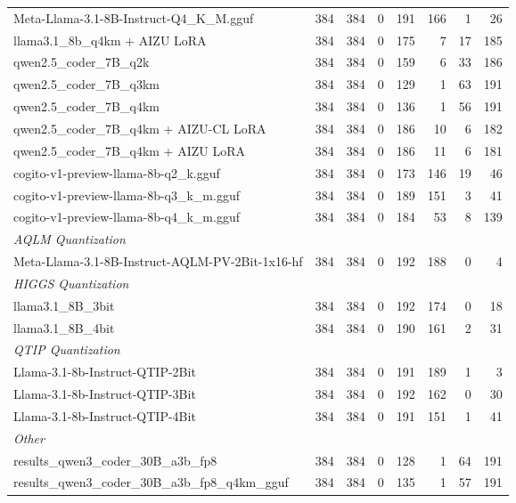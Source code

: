 \begin{table}[htbp]
{\begin{tabular}{lrrrrrrr}
    Meta-Llama-3.1-8B-Instruct-Q4\_K\_M.gguf & 384 & 384 & 0 & 191 & 166 & 1 & 26 \\
    llama3.1\_8b\_q4km + AIZU LoRA & 384 & 384 & 0 & 175 & 7 & 17 & 185 \\
    qwen2.5\_coder\_7B\_q2k & 384 & 384 & 0 & 159 & 6 & 33 & 186 \\
    qwen2.5\_coder\_7B\_q3km & 384 & 384 & 0 & 129 & 1 & 63 & 191 \\
    qwen2.5\_coder\_7B\_q4km & 384 & 384 & 0 & 136 & 1 & 56 & 191 \\
    qwen2.5\_coder\_7B\_q4km + AIZU-CL LoRA & 384 & 384 & 0 & 186 & 10 & 6 & 182 \\
    qwen2.5\_coder\_7B\_q4km + AIZU LoRA & 384 & 384 & 0 & 186 & 11 & 6 & 181 \\
    cogito-v1-preview-llama-8b-q2\_k.gguf & 384 & 384 & 0 & 173 & 146 & 19 & 46 \\
    cogito-v1-preview-llama-8b-q3\_k\_m.gguf & 384 & 384 & 0 & 189 & 151 & 3 & 41 \\
    cogito-v1-preview-llama-8b-q4\_k\_m.gguf & 384 & 384 & 0 & 184 & 53 & 8 & 139 \\
    \midrule
    \multicolumn{8}{l}{\textit{AQLM Quantization}} \\
    \midrule
    Meta-Llama-3.1-8B-Instruct-AQLM-PV-2Bit-1x16-hf & 384 & 384 & 0 & 192 & 188 & 0 & 4 \\
    \midrule
    \multicolumn{8}{l}{\textit{HIGGS Quantization}} \\
    \midrule
    llama3.1\_8B\_3bit & 384 & 384 & 0 & 192 & 174 & 0 & 18 \\
    llama3.1\_8B\_4bit & 384 & 384 & 0 & 190 & 161 & 2 & 31 \\
    \midrule
    \multicolumn{8}{l}{\textit{QTIP Quantization}} \\
    \midrule
    Llama-3.1-8b-Instruct-QTIP-2Bit & 384 & 384 & 0 & 191 & 189 & 1 & 3 \\
    Llama-3.1-8b-Instruct-QTIP-3Bit & 384 & 384 & 0 & 192 & 162 & 0 & 30 \\
    Llama-3.1-8b-Instruct-QTIP-4Bit & 384 & 384 & 0 & 191 & 151 & 1 & 41 \\
    \midrule
    \multicolumn{8}{l}{\textit{Other}} \\
    \midrule
    results\_qwen3\_coder\_30B\_a3b\_fp8 & 384 & 384 & 0 & 128 & 1 & 64 & 191 \\
    results\_qwen3\_coder\_30B\_a3b\_fp8\_q4km\_gguf & 384 & 384 & 0 & 135 & 1 & 57 & 191 \\
    \bottomrule
  \end{tabular}
  }
\end{table}

